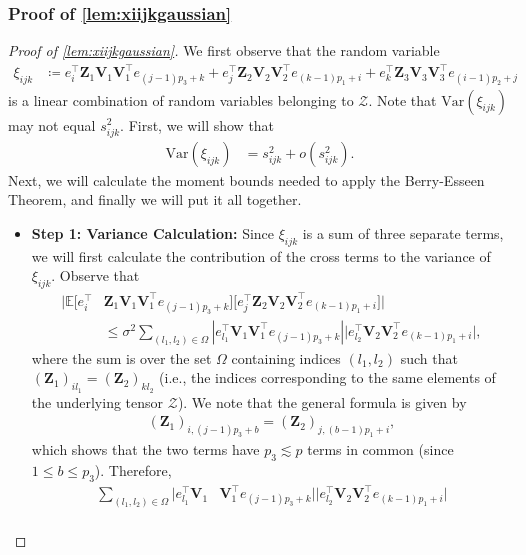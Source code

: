 \documentclass[10pt]{article}
\newcommand{\0}{{\mathbf{0}}}
\newcommand{\1}{{\mathbf{1}}}
\newcommand{\E}{{\mathbf{E}}}
\renewcommand{\t}{^{\top}}
\renewcommand{\E}{\mathbb{E}}
\begin{document}
\subsubsection{Proof of \cref{lem:xiijkgaussian}}
\begin{proof}[Proof of \cref{lem:xiijkgaussian}]
 We first observe that the random variable
\begin{align*}
    \xi_{ijk} &\coloneqq  e_{i}^{\top} \mathbf{Z}_{1} \mathbf{V}_{1} \mathbf{V}_{1}^{\top} e_{(j-1) p_{3}+k}+e_{j}^{\top} \mathbf{Z}_{2} \mathbf{V}_{2} \mathbf{V}_{2}^{\top} e_{(k-1) p_{1}+i}+e_{k}^{\top} \mathbf{Z}_{3} \mathbf{V}_{3} \mathbf{V}_{3}^{\top} e_{(i-1) p_{2}+j}
\end{align*}
is a linear combination of random variables belonging to $\mathcal{Z}$. Note that $\mathrm{Var}(\xi_{ijk})$ may not equal $s^2_{ijk}$.  First, we will show that  
\begin{align*}
    \mathrm{Var}(\xi_{ijk}) &= s^2_{ijk} + o( s^2_{ijk}).
\end{align*}
Next, we will calculate the moment bounds needed to apply the Berry-Esseen Theorem, and finally we will put it all together.
\begin{itemize}
    \item 
\textbf{Step 1: Variance Calculation:} Since $\xi_{ijk}$ is a sum of three separate terms, we will first calculate the contribution of the cross terms to the variance of $\xi_{ijk}$.  Observe that 
\begin{align*}
\bigg| \E \bigg[ e_i\t& \mathbf{Z}_1 \mathbf{V}_1 \mathbf{V}_1\t e_{(j-1)p_3 + k}  \bigg] \bigg[ e_j\t \mathbf{Z}_2 \mathbf{V}_2 \mathbf{V}_2\t e_{(k-1)p_1 + i} \bigg] \bigg| \\
&\leq \sigma^2  \sum_{(l_1,l_2) \in \Omega}  | e_{l_1}\t \mathbf{V}_1 \mathbf{V}_1\t e_{(j-1)p_3 + k} | \big| e_{l_2}\t \mathbf{V}_2 \mathbf{V}_2\t e_{(k-1)p_1 + i} \big|,
\end{align*}
where the sum is over the set $\Omega$ containing indices $(l_1,l_2)$ such that $(\mathbf{Z}_1)_{il_1} = (\mathbf{Z}_2)_{kl_2}$ (i.e., the indices corresponding to the same elements of the underlying tensor $\mathcal{Z}$).  We note that the general formula is given by
\begin{align*}
    (\mathbf{Z}_1)_{i,(j-1)p_3 + b} = (\mathbf{Z}_2)_{j,(b-1)p_1 + i},
\end{align*}
which shows that the two terms have $p_3 \lesssim p$ terms in common (since $1\leq b \leq p_3$).  Therefore,
\begin{align*}
     \sum_{(l_1,l_2) \in \Omega}  | e_{l_1}\t \mathbf{V}_1 &\mathbf{V}_1\t e_{(j-1)p_3 + k} | \big| e_{l_2}\t \mathbf{V}_2 \mathbf{V}_2\t e_{(k-1)p_1 + i} \big| \\

\end{align*}
\end{itemize}
\end{proof}
\end{document}

